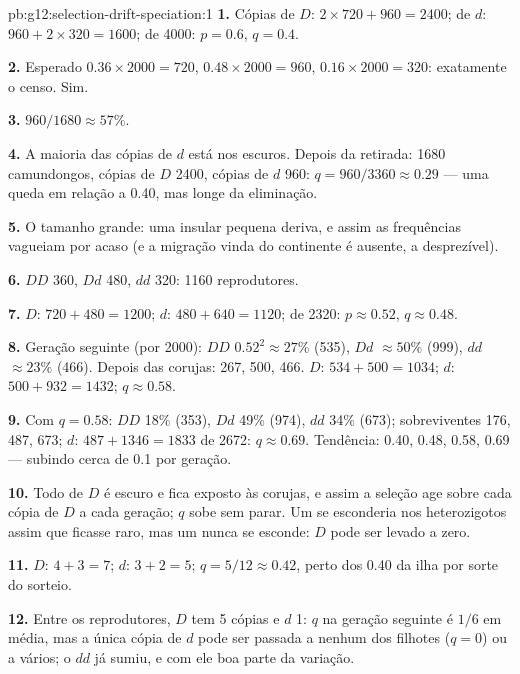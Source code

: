\begin{solution}{pb:g12:selection-drift-speciation:1}
\textbf{1.} Cópias de $D$: $2 \times 720 + 960 = 2400$; de $d$: $960 +
2 \times 320 = 1600$; de 4000: $p = 0.6$, $q = 0.4$.

\textbf{2.} Esperado $0.36 \times 2000 = 720$, $0.48 \times 2000 =
960$, $0.16 \times 2000 = 320$: exatamente o censo. Sim.

\textbf{3.} $960/1680 \approx 57\%$.

\textbf{4.} A maioria das cópias de $d$ está nos  escuros.
Depois da retirada: 1680 camundongos, cópias de $D$ 2400, cópias de $d$
960: $q = 960/3360 \approx
0.29$ --- uma queda em relação a 0.40, mas longe da eliminação.

\textbf{5.} O tamanho grande: uma  insular pequena deriva, e
assim as frequências vagueiam por acaso (e a migração vinda do
continente é ausente, a  desprezível).

\textbf{6.} $DD$ 360, $Dd$ 480, $dd$ 320: 1160 reprodutores.

\textbf{7.} $D$: $720 + 480 = 1200$; $d$: $480 + 640 = 1120$; de 2320:
$p \approx 0.52$, $q \approx 0.48$.

\textbf{8.} Geração seguinte (por 2000): $DD$ $0.52^2 \approx 27\%$
(535), $Dd$ $\approx 50\%$ (999), $dd$ $\approx 23\%$ (466). Depois das
corujas: 267, 500, 466. $D$: $534 + 500 = 1034$; $d$: $500 + 932 =
1432$; $q \approx 0.58$.

\textbf{9.} Com $q = 0.58$: $DD$ 18\% (353), $Dd$ 49\% (974), $dd$
34\% (673); sobreviventes 176, 487, 673; $d$: $487 + 1346 = 1833$ de
2672: $q \approx 0.69$. Tendência: 0.40, 0.48, 0.58, 0.69 --- subindo
cerca de 0.1 por geração.

\textbf{10.} Todo  de $D$ é escuro e fica exposto às corujas, e
assim a seleção age sobre cada cópia de $D$ a cada geração; $q$ sobe
sem parar. Um   se esconderia nos heterozigotos assim que
ficasse raro, mas um  nunca se esconde: $D$ pode ser levado a zero.

\textbf{11.} $D$: $4 + 3 = 7$; $d$: $3 + 2 = 5$; $q = 5/12 \approx
0.42$, perto dos 0.40 da ilha por sorte do sorteio.

\textbf{12.} Entre os reprodutores, $D$ tem 5 cópias e $d$ 1: $q$ na
geração seguinte é $1/6$ em média, mas a única cópia de $d$ pode ser
passada a nenhum dos filhotes ($q = 0$) ou a vários; o  $dd$ já
sumiu, e com ele boa parte da variação.


\end{solution}
